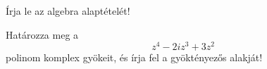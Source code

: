 \documentclass[11pt]{scrartcl}
\begin{document}
Írja le az algebra alaptételét!

Határozza meg a
\[
	z^4 - 2i z^3 + 3z^2
\]
polinom komplex gyökeit, és írja fel a gyöktényezős alakját!
\end{document}
